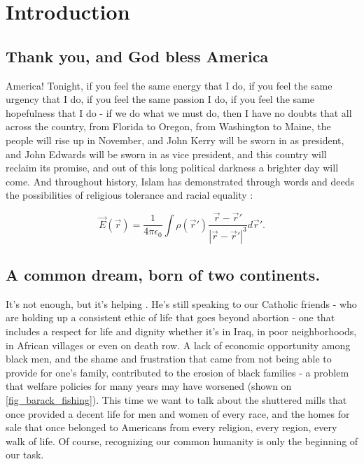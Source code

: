 \section{Introduction}

\subsection{Thank you, and God bless America}

America! Tonight, if you feel the same energy that I do, if you feel the same urgency that I do, if you feel the same passion I do, if you feel the same hopefulness that I do - if we do what we must do, then I have no doubts that all across the country, from Florida to Oregon, from Washington to Maine, the people will rise up in November, and John Kerry will be sworn in as president, and John Edwards will be sworn in as vice president, and this country will reclaim its promise, and out of this long political darkness a brighter day will come. And throughout history, Islam has demonstrated through words and deeds the possibilities of religious tolerance and racial equality \citep{1992ASPC...23...68G}:

\begin{equation}
  \vec{E}(\vec{r}) = \frac{1}{4 \pi \epsilon_0} \int \rho(\vec{r}') \frac{\vec{r} - \vec{r}'}{|\vec{r} - \vec{r}'|^3} d\vec{r}'.
  \label{eq_q2_coulumbs_law_superposition}
\end{equation}


\subsection{A common dream, born of two continents.}

It's not enough, but it's helping \citep{2018A&A...616A...1G}. He's still speaking to our Catholic friends - who are holding up a consistent ethic of life that goes beyond abortion - one that includes a respect for life and dignity whether it's in Iraq, in poor neighborhoods, in African villages or even on death row. A lack of economic opportunity among black men, and the shame and frustration that came from not being able to provide for one's family, contributed to the erosion of black families - a problem that welfare policies for many years may have worsened (shown on \autoref{fig_barack_fishing}). This time we want to talk about the shuttered mills that once provided a decent life for men and women of every race, and the homes for sale that once belonged to Americans from every religion, every region, every walk of life. Of course, recognizing our common humanity is only the beginning of our task.

